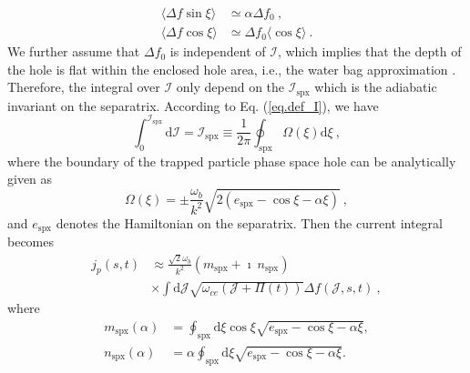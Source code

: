  \cite{berk1999} 
\begin{equation}
    \begin{aligned}
    \langle\Delta f \sin \xi \rangle &\simeq \alpha \Delta f_0 ~, \\ 
    \langle \Delta f \cos \xi \rangle &\simeq  \Delta f_0 \langle \cos \xi \rangle ~.
    \end{aligned}
\end{equation}
We further assume that $\Delta f_0$ is independent of $\mathcal{I}$, which implies that the depth of the hole is flat within the enclosed hole area, i.e., the water bag approximation \cite{omura_theory_2008,hezaveh2021}. 
Therefore, the integral over $\mathcal{I}$ only depend on the $\mathcal{I}_\mathrm{spx}$ which is the 
 adiabatic invariant on the separatrix. 
According to Eq. (\ref{eq.def_I}), we have
\begin{equation}
    \int^{\mathcal{I}_\mathrm{s p x}}_0 \mathrm{d}\mathcal{I} = \mathcal{I}_\mathrm{s p x} \equiv {\frac{1}{2\pi}} \oint_\mathrm{s p x} \Omega (\xi) \mathrm{d} \xi~,
\end{equation}
where the boundary of the trapped particle phase space hole can be analytically given as
\begin{equation}\label{eq.bound}
    \Omega(\xi) = \pm \frac{\omega_b}{k^2} \sqrt{2 (e_\mathrm{spx}-\cos \xi - \alpha \xi)}~,
\end{equation}
and $e_\mathrm{spx}$ denotes the Hamiltonian on the separatrix.
Then the current integral becomes  
\begin{equation}\label{eq.adi_J}
    \begin{aligned}
    j_p(s,t) & \approx \frac{\sqrt{2} \omega_b}{k^2}  \left(m_\mathrm{s p x}+\imath ~ n_\mathrm{s p x}\right) \\
    & \times  \int \mathrm{d} \mathcal{J} \sqrt{ \omega_{c e}(\mathcal{J}+\Pi(t))} \Delta f(\mathcal{J},s,t) ~,
    \end{aligned}
\end{equation}
where
\begin{equation}\label{eq.function}
    \begin{aligned}
        m_\mathrm{spx}(\alpha) & = \oint_\mathrm{s p x} \mathrm{d} \xi \cos \xi \sqrt{e_\mathrm{s p x}-\cos \xi-\alpha \xi}, 
        \\
        n_\mathrm{spx}(\alpha) &  = \alpha \oint_\mathrm{s p x} \mathrm{d} \xi \sqrt{e_\mathrm{s p x}-\cos \xi-\alpha \xi}.
    \end{aligned}
\end{equation}
